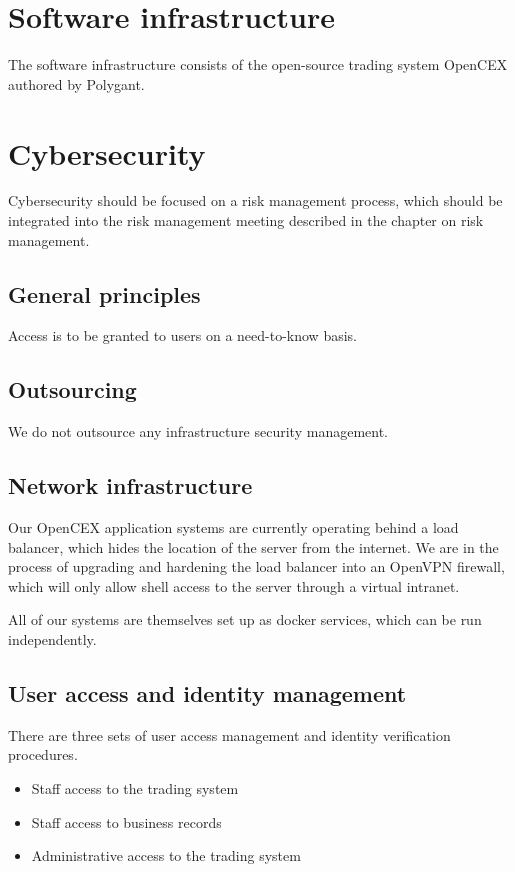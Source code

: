 \section{Software infrastructure}
The software infrastructure consists of the open-source trading system
OpenCEX authored by Polygant.

\section{Cybersecurity}
Cybersecurity should be focused on a risk management process, which
should be integrated into the risk management meeting described in the
chapter on risk management.

\subsection{General principles}
Access is to be granted to users on a need-to-know basis.

\subsection{Outsourcing}
We do not outsource any infrastructure security management.

\subsection{Network infrastructure}
Our OpenCEX application systems are currently operating behind a load balancer,
which hides the location of the server from the internet.  We are in
the process of upgrading and hardening the load balancer into an OpenVPN firewall, which will only allow shell access to the server through a virtual intranet.

All of our systems are themselves set up as docker services, which can
be run independently.

\subsection{User access and identity management}

There are three sets of user access management and identity
verification procedures.
\begin{itemize}
\item Staff access to the trading system
\item Staff access to business records
\item Administrative access to the trading system
\end{itemize}


